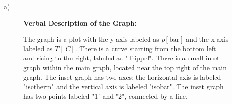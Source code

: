 a)

\begin{figure}[h]
\centering
\begin{minipage}{0.5\textwidth}
\centering
\textbf{Verbal Description of the Graph:}

The graph is a plot with the y-axis labeled as $p[\text{bar}]$ and the x-axis labeled as $T[^\circ C]$. There is a curve starting from the bottom left and rising to the right, labeled as "Trippel". There is a small inset graph within the main graph, located near the top right of the main graph. The inset graph has two axes: the horizontal axis is labeled "isotherm" and the vertical axis is labeled "isobar". The inset graph has two points labeled "1" and "2", connected by a line.
\end{minipage}
\end{figure}